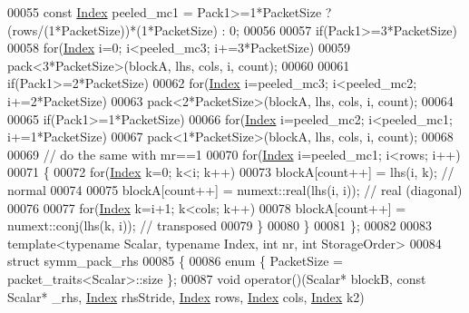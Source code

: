 \begin{DoxyCode}
00055     \textcolor{keyword}{const} \hyperlink{namespace_eigen_a62e77e0933482dafde8fe197d9a2cfde}{Index} peeled\_mc1 = Pack1>=1*PacketSize ? (rows/(1*PacketSize))*(1*PacketSize) : 0;
00056     
00057     \textcolor{keywordflow}{if}(Pack1>=3*PacketSize)
00058       \textcolor{keywordflow}{for}(\hyperlink{namespace_eigen_a62e77e0933482dafde8fe197d9a2cfde}{Index} i=0; i<peeled\_mc3; i+=3*PacketSize)
00059         pack<3*PacketSize>(blockA, lhs, cols, i, count);
00060     
00061     \textcolor{keywordflow}{if}(Pack1>=2*PacketSize)
00062       \textcolor{keywordflow}{for}(\hyperlink{namespace_eigen_a62e77e0933482dafde8fe197d9a2cfde}{Index} i=peeled\_mc3; i<peeled\_mc2; i+=2*PacketSize)
00063         pack<2*PacketSize>(blockA, lhs, cols, i, count);
00064     
00065     \textcolor{keywordflow}{if}(Pack1>=1*PacketSize)
00066       \textcolor{keywordflow}{for}(\hyperlink{namespace_eigen_a62e77e0933482dafde8fe197d9a2cfde}{Index} i=peeled\_mc2; i<peeled\_mc1; i+=1*PacketSize)
00067         pack<1*PacketSize>(blockA, lhs, cols, i, count);
00068 
00069     \textcolor{comment}{// do the same with mr==1}
00070     \textcolor{keywordflow}{for}(\hyperlink{namespace_eigen_a62e77e0933482dafde8fe197d9a2cfde}{Index} i=peeled\_mc1; i<rows; i++)
00071     \{
00072       \textcolor{keywordflow}{for}(\hyperlink{namespace_eigen_a62e77e0933482dafde8fe197d9a2cfde}{Index} k=0; k<i; k++)
00073         blockA[count++] = lhs(i, k);                   \textcolor{comment}{// normal}
00074 
00075       blockA[count++] = numext::real(lhs(i, i));       \textcolor{comment}{// real (diagonal)}
00076 
00077       \textcolor{keywordflow}{for}(\hyperlink{namespace_eigen_a62e77e0933482dafde8fe197d9a2cfde}{Index} k=i+1; k<cols; k++)
00078         blockA[count++] = numext::conj(lhs(k, i));     \textcolor{comment}{// transposed}
00079     \}
00080   \}
00081 \};
00082 
00083 \textcolor{keyword}{template}<\textcolor{keyword}{typename} Scalar, \textcolor{keyword}{typename} Index, \textcolor{keywordtype}{int} nr, \textcolor{keywordtype}{int} StorageOrder>
00084 \textcolor{keyword}{struct }symm\_pack\_rhs
00085 \{
00086   \textcolor{keyword}{enum} \{ PacketSize = packet\_traits<Scalar>::size \};
00087   \textcolor{keywordtype}{void} operator()(Scalar* blockB, \textcolor{keyword}{const} Scalar* \_rhs, \hyperlink{namespace_eigen_a62e77e0933482dafde8fe197d9a2cfde}{Index} rhsStride, 
      \hyperlink{namespace_eigen_a62e77e0933482dafde8fe197d9a2cfde}{Index} rows, \hyperlink{namespace_eigen_a62e77e0933482dafde8fe197d9a2cfde}{Index} cols, \hyperlink{namespace_eigen_a62e77e0933482dafde8fe197d9a2cfde}{Index} k2)

\end{DoxyCode}
